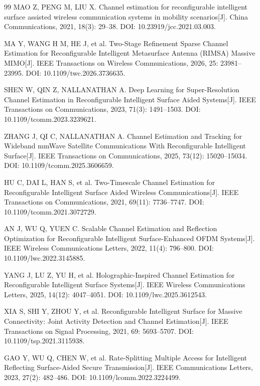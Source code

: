 \begin{thebibliography}{99}
 MAO Z, PENG M, LIU X. Channel estimation for reconfigurable intelligent surface assisted wireless communication systems in mobility scenarios[J]. China Communications, 2021, 18(3): 29--38. DOI: 10.23919/jcc.2021.03.003.

 MA Y, WANG H M, HE J, et al. Two-Stage Refinement Sparse Channel Estimation for Reconfigurable Intelligent Metasurface Antenna (RIMSA) Massive MIMO[J]. IEEE Transactions on Wireless Communications, 2026, 25: 23981--23995. DOI: 10.1109/twc.2026.3736635.

 SHEN W, QIN Z, NALLANATHAN A. Deep Learning for Super-Resolution Channel Estimation in Reconfigurable Intelligent Surface Aided Systems[J]. IEEE Transactions on Communications, 2023, 71(3): 1491--1503. DOI: 10.1109/tcomm.2023.3239621.

 ZHANG J, QI C, NALLANATHAN A. Channel Estimation and Tracking for Wideband mmWave Satellite Communications With Reconfigurable Intelligent Surface[J]. IEEE Transactions on Communications, 2025, 73(12): 15020--15034. DOI: 10.1109/tcomm.2025.3606659.

 HU C, DAI L, HAN S, et al. Two-Timescale Channel Estimation for Reconfigurable Intelligent Surface Aided Wireless Communications[J]. IEEE Transactions on Communications, 2021, 69(11): 7736--7747. DOI: 10.1109/tcomm.2021.3072729.

 AN J, WU Q, YUEN C. Scalable Channel Estimation and Reflection Optimization for Reconfigurable Intelligent Surface-Enhanced OFDM Systems[J]. IEEE Wireless Communications Letters, 2022, 11(4): 796--800. DOI: 10.1109/lwc.2022.3145885.

 YANG J, LU Z, YU H, et al. Holographic-Inspired Channel Estimation for Reconfigurable Intelligent Surface Systems[J]. IEEE Wireless Communications Letters, 2025, 14(12): 4047--4051. DOI: 10.1109/lwc.2025.3612543.

 XIA S, SHI Y, ZHOU Y, et al. Reconfigurable Intelligent Surface for Massive Connectivity: Joint Activity Detection and Channel Estimation[J]. IEEE Transactions on Signal Processing, 2021, 69: 5693--5707. DOI: 10.1109/tsp.2021.3115938.

 GAO Y, WU Q, CHEN W, et al. Rate-Splitting Multiple Access for Intelligent Reflecting Surface-Aided Secure Transmission[J]. IEEE Communications Letters, 2023, 27(2): 482--486. DOI: 10.1109/lcomm.2022.3224499.


\end{thebibliography}
